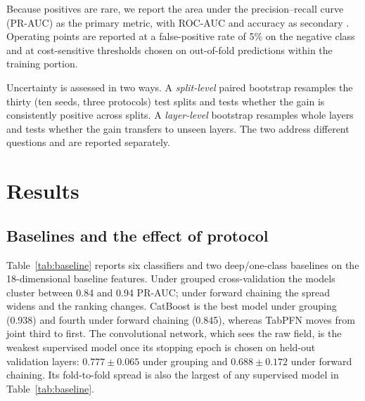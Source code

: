 \documentclass[preprint,12pt]{elsarticle}
\begin{document}
Because positives are rare, we report the area under the precision--recall curve (PR-AUC) as the primary metric, with ROC-AUC and accuracy as secondary \cite{saito2015}. Operating points are reported at a false-positive rate of 5\% on the negative class and at cost-sensitive thresholds chosen on out-of-fold predictions within the training portion.

Uncertainty is assessed in two ways. A \emph{split-level} paired bootstrap resamples the thirty (ten seeds, three protocols) test splits and tests whether the gain is consistently positive across splits. A \emph{layer-level} bootstrap resamples whole layers and tests whether the gain transfers to unseen layers. The two address different questions and are reported separately.

\section{Results}

\subsection{Baselines and the effect of protocol}

Table~\ref{tab:baseline} reports six classifiers and two deep/one-class baselines on the 18-dimensional baseline features. Under grouped cross-validation the models cluster between 0.84 and 0.94 PR-AUC; under forward chaining the spread widens and the ranking changes. CatBoost is the best model under grouping (0.938) and fourth under forward chaining (0.845), whereas TabPFN moves from joint third to first. The convolutional network, which sees the raw field, is the weakest supervised model once its stopping epoch is chosen on held-out validation layers: $0.777 \pm 0.065$ under grouping and $0.688 \pm 0.172$ under forward chaining. Its fold-to-fold spread is also the largest of any supervised model in Table~\ref{tab:baseline}.
\end{document}
